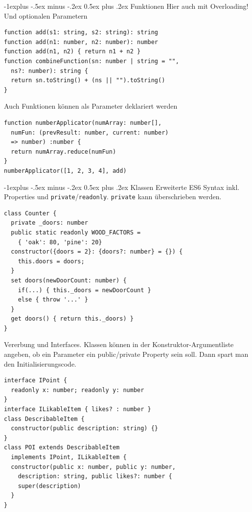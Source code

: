 \documentclass[a4paper, fontsize=6pt]{scrartcl}
\makeatletter
\renewcommand{\subsection}{\@startsection{subsection}{2}{0mm}%
    {-1explus -.5ex minus -.2ex}%
    {0.5ex plus .2ex}%
    {\normalfont\normalsize\bfseries}}
\newcommand{\js}[1]{\texttt{#1}}
\makeatother
\begin{document}
\begin{multicols*}{5}
\subsection{Funktionen}
Hier auch mit Overloading! Und optionalen Parametern
\begin{verbatim}
function add(s1: string, s2: string): string
function add(n1: number, n2: number): number
function add(n1, n2) { return n1 + n2 }
function combineFunction(sn: number | string = "",
  ns?: number): string {
  return sn.toString() + (ns || "").toString()
}
\end{verbatim}
Auch Funktionen können als Parameter deklariert werden
\begin{verbatim}
function numberApplicator(numArray: number[],
  numFun: (prevResult: number, current: number)
  => number) :number {
  return numArray.reduce(numFun)
}
numberApplicator([1, 2, 3, 4], add)
\end{verbatim}
\subsection{Klassen}
Erweiterte ES6 Syntax inkl. Properties und \js{private}/\js{readonly}. \js{private} kann überschrieben werden.
\begin{verbatim}
class Counter {
  private _doors: number
  public static readonly WOOD_FACTORS = 
    { 'oak': 80, 'pine': 20}
  constructor({doors = 2}: {doors?: number} = {}) {
    this.doors = doors;
  }
  set doors(newDoorCount: number) {
    if(...) { this._doors = newDoorCount }
    else { throw '...' }
  }
  get doors() { return this._doors) }
}
\end{verbatim}
Vererbung und Interfaces. Klassen können in der Konstruktor-Argumentliste angeben, ob ein Parameter ein public/private Property sein soll. Dann spart man den Initialisierungscode.
\begin{verbatim}
interface IPoint { 
  readonly x: number; readonly y: number
}
interface ILikableItem { likes? : number }
class DescribableItem {
  constructor(public description: string) {}
}
class POI extends DescribableItem
  implements IPoint, ILikableItem {
  constructor(public x: number, public y: number,
    description: string, public likes?: number { 
    super(description)
  }
}

\end{verbatim}


\end{multicols*}
\end{document}
